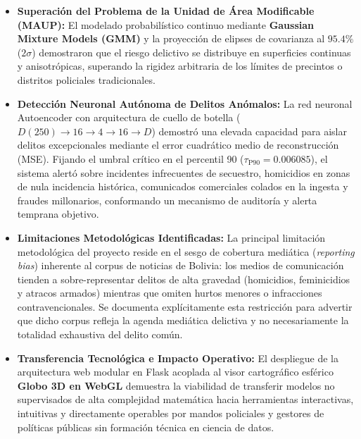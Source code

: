 \begin{itemize}
    \item \textbf{Superación del Problema de la Unidad de Área Modificable (MAUP):} El modelado probabilístico continuo mediante \textbf{Gaussian Mixture Models (GMM)} y la proyección de elipses de covarianza al $95.4\%$ ($2\sigma$) demostraron que el riesgo delictivo se distribuye en superficies continuas y anisotrópicas, superando la rigidez arbitraria de los límites de precintos o distritos policiales tradicionales.
    
    \item \textbf{Detección Neuronal Autónoma de Delitos Anómalos:} La red neuronal Autoencoder con arquitectura de cuello de botella ($D(250) \to 16 \to 4 \to 16 \to D$) demostró una elevada capacidad para aislar delitos excepcionales mediante el error cuadrático medio de reconstrucción (MSE). Fijando el umbral crítico en el percentil 90 ($\tau_{\text{P90}} = 0.006085$), el sistema alertó sobre incidentes infrecuentes de secuestro, homicidios en zonas de nula incidencia histórica, comunicados comerciales colados en la ingesta y fraudes millonarios, conformando un mecanismo de auditoría y alerta temprana objetivo.
    
    \item \textbf{Limitaciones Metodológicas Identificadas:} La principal limitación metodológica del proyecto reside en el sesgo de cobertura mediática (\textit{reporting bias}) inherente al corpus de noticias de Bolivia: los medios de comunicación tienden a sobre-representar delitos de alta gravedad (homicidios, feminicidios y atracos armados) mientras que omiten hurtos menores o infracciones contravencionales. Se documenta explícitamente esta restricción para advertir que dicho corpus refleja la agenda mediática delictiva y no necesariamente la totalidad exhaustiva del delito común.
    
    \item \textbf{Transferencia Tecnológica e Impacto Operativo:} El despliegue de la arquitectura web modular en Flask acoplada al visor cartográfico esférico \textbf{Globo 3D en WebGL} demuestra la viabilidad de transferir modelos no supervisados de alta complejidad matemática hacia herramientas interactivas, intuitivas y directamente operables por mandos policiales y gestores de políticas públicas sin formación técnica en ciencia de datos.
\end{itemize}


